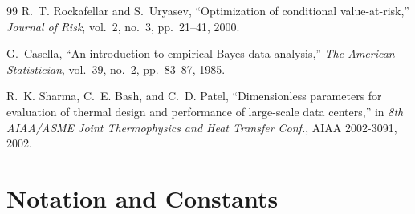 \documentclass[11pt]{article}
\begin{document}
\begin{thebibliography}{99}
 R.~T. Rockafellar and S.~Uryasev, ``Optimization of conditional
value-at-risk,'' \emph{Journal of Risk}, vol.~2, no.~3, pp.~21--41, 2000.

 G.~Casella, ``An introduction to empirical Bayes data analysis,''
\emph{The American Statistician}, vol.~39, no.~2, pp.~83--87, 1985.

 R.~K. Sharma, C.~E. Bash, and C.~D. Patel, ``Dimensionless parameters for
evaluation of thermal design and performance of large-scale data centers,'' in
\emph{8th AIAA/ASME Joint Thermophysics and Heat Transfer Conf.}, AIAA 2002-3091, 2002.

\end{thebibliography}

\appendix
\section{Notation and Constants}
\label{app:notation}
\end{document}
